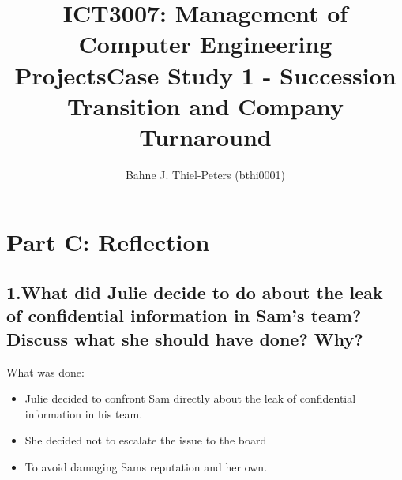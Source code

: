 \documentclass[a4paper,10pt]{article}
\title{ICT3007: Management of Computer Engineering Projects\newline \centering Case Study 1 - Succession Transition and Company Turnaround}
\author{
Bahne J. Thiel-Peters (bthi0001)
}
\begin{document}
\maketitle
\thispagestyle{empty}

\setcounter{page}{1}

\section{Part C: Reflection}
\subsection{1.What did Julie decide to do about the leak of confidential information in Sam’s team? Discuss what she should have done? Why?}

What was done:
\begin{itemize}
    \item Julie decided to confront Sam directly about the leak of confidential information in his team.
    \item She decided not to escalate the issue to the board
    \item To avoid damaging Sams reputation and her own.
\end{itemize}
\end{document}
